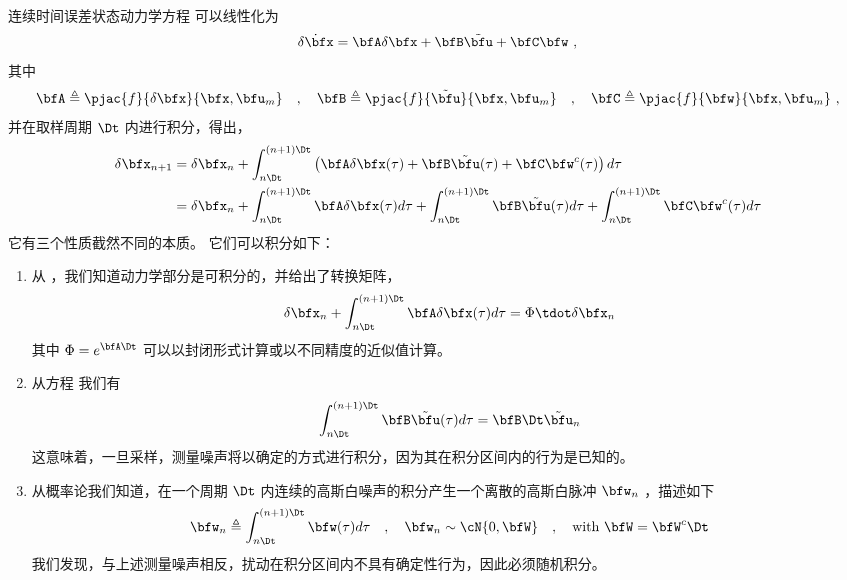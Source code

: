 \bigskip
连续时间误差状态动力学方程  可以线性化为
%
\begin{equation}
\dot{\delta\bfx} = \bfA\delta\bfx + \bfB\tilde\bfu + \bfC \bfw~, \label{equ:contTime}
\end{equation}
%
其中 
%
\begin{equation}
\bfA\triangleq\pjac{f}{\delta\bfx}{\bfx,\bfu_m}\quad,\quad
\bfB\triangleq\pjac{f}{\tilde\bfu}{\bfx,\bfu_m}\quad,\quad
\bfC\triangleq\pjac{f}{\bfw}{\bfx,\bfu_m}~,
\end{equation}
%
并在取样周期 $\Dt$ 内进行积分，得出，
%
\begin{align}
\delta\bfx_{n+1} &= \delta\bfx_n 
+ \int_{n\Dt}^{(n+1)\Dt} \left(
\bfA\delta\bfx(\tau) + \bfB\tilde\bfu(\tau) + \bfC\bfw^c(\tau)
\right) d\tau \\
 &= \delta\bfx_n 
+ \int_{n\Dt}^{(n+1)\Dt} \bfA\delta\bfx(\tau)   d\tau
+ \int_{n\Dt}^{(n+1)\Dt} \bfB\tilde\bfu(\tau)   d\tau 
+ \int_{n\Dt}^{(n+1)\Dt} \bfC\bfw^c(\tau) d\tau 
\end{align}
%
它有三个性质截然不同的本质。 
它们可以积分如下：
%
\begin{enumerate}
\item 从  ，我们知道动力学部分是可积分的，并给出了转换矩阵，
%
\begin{equation}
\delta\bfx_n 
+ \int_{n\Dt}^{(n+1)\Dt} \bfA\delta\bfx(\tau)   d\tau = \Phi\tdot\delta\bfx_n
\end{equation}
%
其中 $\Phi=e^{\bfA\Dt}$ 可以以封闭形式计算或以不同精度的近似值计算。

\item 从方程  我们有
%
\begin{equation}
\int_{n\Dt}^{(n+1)\Dt} \bfB\tilde\bfu(\tau)   d\tau = \bfB\Dt\tilde\bfu_n
\end{equation}
%
这意味着，一旦采样，测量噪声将以确定的方式进行积分，因为其在积分区间内的行为是已知的。

\item 从概率论我们知道，在一个周期 $\Dt$ 内连续的高斯白噪声的积分产生一个离散的高斯白脉冲 $\bfw_n$ ，描述如下
%
\begin{equation}
\bfw_n\triangleq\int_{n\Dt}^{(n+1)\Dt}\bfw(\tau)d\tau 
\quad,\quad
\bfw_n \sim \cN\{0,\bfW\} 
\quad,\quad
 \text{with } \bfW = \bfW^c\Dt
\end{equation}
%
我们发现，与上述测量噪声相反，扰动在积分区间内不具有确定性行为，因此必须随机积分。

\end{enumerate}%
